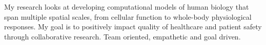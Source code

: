 \par{
My research looks at developing computational models of human biology that span multiple spatial scales, from cellular function to whole-body physiological responses. My goal is to positively impact quality of healthcare and patient safety through collaborative research. Team oriented, empathetic and goal driven.
}